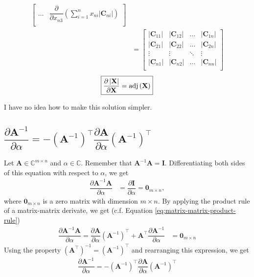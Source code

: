\documentclass{article}
\newcommand{\trans}{\top}
\newcommand{\adj}[1]{\ensuremath{\textnormal{adj}\left(#1\right)}} %
\newcommand\abs[1]{\left\lvert#1\right\rvert}
\begin{document}
\begin{align}
\begin{bmatrix}
        \dots & 
        \displaystyle \dfrac{\partial}{\partial x_{n3}} \left( \sum_{i = 1}^{n} x_{ni} \abs{\mathbf{C}_{ni}} \right) \\
    \end{bmatrix} \\
    &= \begin{bmatrix}
        \abs{\mathbf{C}_{11}} & \abs{\mathbf{C}_{12}} & \dots & \abs{\mathbf{C}_{1n}} \\
        \abs{\mathbf{C}_{21}} & \abs{\mathbf{C}_{22}} & \dots & \abs{\mathbf{C}_{2n}} \\
        \vdots & \vdots & \ddots & \vdots \\
        \abs{\mathbf{C}_{n1}} & \abs{\mathbf{C}_{n2}} & \dots & \abs{\mathbf{C}_{nn}} \\
    \end{bmatrix}
\end{align}
\begin{align}
    \boxed{\dfrac{\partial \abs{\mathbf{X}}}{\partial \mathbf{X}} = \adj{\mathbf{X}}}
\end{align}

I have no idea how to make this solution simpler.

\subsection{\(\dfrac{\partial \mathbf{A}^{-1}}{\partial \alpha} = - {\left( \mathbf{A}^{-1} \right)}^{\trans} \dfrac{\partial \mathbf{A}}{\partial \alpha} {\left( \mathbf{A}^{-1} \right)}^{\trans}\)}
Let \(\mathbf{A}\in \mathbb{C}^{m\times n}\) and \(\alpha \in \mathbb{C}\). Remember that \(\mathbf{A}^{-1}\mathbf{A} = \mathbf{I}\). Differentiating both sides of this equation with respect to \(\alpha\), we get
\begin{align}
    \dfrac{\partial \mathbf{A}^{-1}\mathbf{A}}{\partial \alpha} & = \dfrac{\partial \mathbf{I}}{\partial \alpha} = \mathbf{0}_{m \times n},
\end{align}
where \(\mathbf{0}_{m \times n}\) is a zero matrix with dimension \(m \times n\). By applying the product rule of a matrix-matrix derivate, we get (c.f. Equation \eqref{eq:matrix-matrix-product-rule})
\begin{align}
    \dfrac{\partial \mathbf{A}^{-1}\mathbf{A}}{\partial \alpha} =  \dfrac{\partial \mathbf{A}}{\partial \alpha} \left( \mathbf{A}^{-1} \right)^{\trans} + \mathbf{A}^{\trans} \dfrac{\partial \mathbf{A}^{-1}}{\partial \alpha} & = \mathbf{0}_{m \times n}
\end{align}
Using the property \(\left( \mathbf{A}^{\trans} \right)^{-1} = \left( \mathbf{A}^{-1} \right)^{\trans}\) and rearranging this expression, we get
\begin{align}
    \boxed{\dfrac{\partial \mathbf{A}^{-1}}{\partial \alpha} = - {\left( \mathbf{A}^{-1} \right)}^{\trans} \dfrac{\partial \mathbf{A}}{\partial \alpha} {\left( \mathbf{A}^{-1} \right)}^{\trans}}
\end{align}

\nocite{*}
\printbibliography
\end{document}
